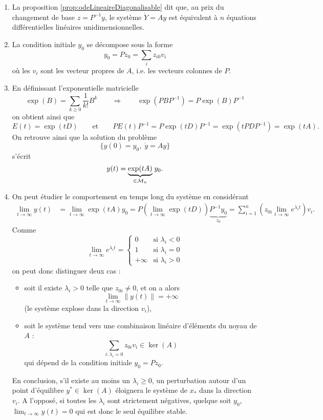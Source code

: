 \remarks
\begin{enumerate}
  \item La proposition \ref{prop:odeLineaireDiagonalisable} dit que, au prix du changement de base $z = P^{-1} y$, le système $\dot Y = A y$ est équivalent à $n$ équations différentielles linéaires unidimensionnelles.
  \item La condition initiale $y_0$ se décompose sous la forme
  $$
  y_0 = P z_0 = \sum_i z_{i0} v_i
  $$
  où les $v_i$ sont les vecteur propres de $A$, i.e. les vecteurs colonnes de $P$.
  \item En définissant l'exponentielle matricielle
  $$
  \exp(B) = \sum_{k \geq 0} \frac1{k!} B^k
  \qquad \Rightarrow \qquad
  \exp(P B P^{-1}) = P \exp(B) P^{-1}
  $$
  on obtient ainsi que
  $$
  E(t) = \exp(t D) 
  \qquad \text{et} \qquad 
  P E(t) P^{-1} = P \exp(t D) P^{-1} = \exp(t P D P^{-1}) = \exp(t A).
  $$
  On retrouve ainsi que la solution du problème
  $$
  \{y(0) = y_0, \; \dot y = A y\}
  $$
  s'écrit
  $$
  y(t) = \underset{\in \mathcal{M}_n}{\underbrace{\exp(t A)}} \; y_0.
  $$
  \item On peut étudier le comportement en temps long du système en considérant
  \begin{align*}
    \lim_{t \to \infty} y(t)
    & = \lim_{t \to \infty} \exp(t A) y_0 
    = P \left(\lim_{t \to \infty} \exp(t D)\right) \underset{z_0}{\underbrace{P^{-1} y_0}}
    = \sum_{i=1}^n \left(z_{0i} \lim_{t \to \infty} e^{\lambda_i t}\right) v_i.
  \end{align*}
  Comme
  $$
  \lim_{t \to \infty} e^{\lambda_i t} = 
  \left\{\begin{array}{rr}
          0 & \text{si } \lambda_i < 0 \\
          1 & \text{si } \lambda_i = 0 \\
          +\infty & \text{si } \lambda_i > 0
         \end{array}\right.
  $$
  on peut donc distinguer deux cas : 
  \begin{itemize}
  \item soit il existe $\lambda_i > 0$ telle que $z_{0i} \neq 0$, et on a alors
  $$
  \lim_{t \to \infty} \|y(t)\| = + \infty
  $$
  (le système explose dans la direction $v_i$), 
  \item soit le système tend vers une combinaison linéaire d'éléments du noyau de $A$ :
  $$
  \sum_{i : \lambda_i = 0} z_{0i} v_i \in \ker(A)
  $$
  qui dépend de la condition initiale $y_0 = P z_0$.
  \end{itemize}
  En conclusion, s'il existe au moins un $\lambda_i \geq 0$, un perturbation autour d'un point d'équilibre $y^* \in \ker(A)$ éloignera le système de $x_ *$ dans la direction $v_i$. A l'opposé, si toutes les $\lambda_i$ sont strictement négatives, quelque soit $y_0$, $\lim_{t \to \infty} y(t) = 0$ qui est donc le seul équilibre stable.
\end{enumerate}

